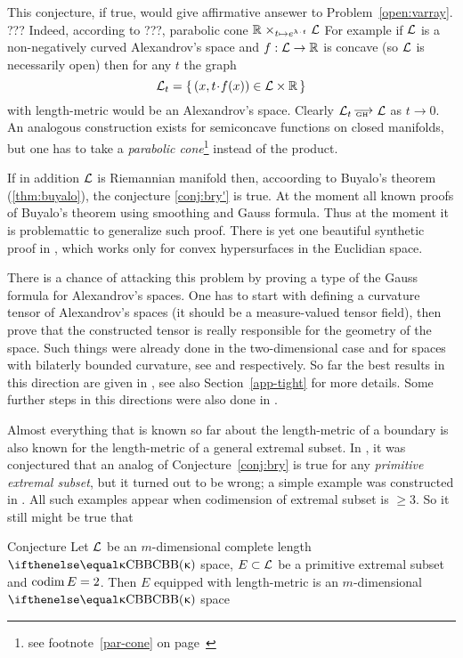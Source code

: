 This conjecture, if true, would give affirmative ansewer to Problem~\ref{open:varray}.
???
Indeed, according to ???,
parabolic cone $\RR\warp{t\mapsto e^{\lambda\cdot t}}\spc{L}$
For example if $\mathcal{L}$ is a non-negatively curved Alexandrov's space and $f:\spc{L}\to\RR$ is concave (so $\mathcal{L}$ is necessarily open) then for any $t$ the graph
\[\spc{L}_t=\{\,(x,t\cdot f(x))\in \spc{L}\times\RR\,\}\]
with length-metric would be an Alexandrov's space. 
Clearly $\spc{L}_t\GHto \spc{L}$ as $t\to0$. 
An analogous construction exists for semiconcave functions on closed manifolds, but
one has to take a \emph{parabolic cone}\footnote{see footnote~\ref{par-cone} on page~\pageref{par-cone}} instead of the product.




If in addition $\mathcal{L}$ is Riemannian manifold
then, accoording to Buyalo's theorem (\ref{thm:buyalo}),
the conjecture \ref{conj:bry'} is true.
At the moment all known proofs of Buyalo's theorem using smoothing and Gauss formula.
Thus at the moment it is problemattic to generalize such proof.
There is yet one beautiful synthetic proof in \cite{milka-conv}, which works only for convex hypersurfaces in the Euclidian space.

There is a chance of attacking this problem by proving a type of the Gauss formula for
Alexandrov's spaces. 
One has to start with defining a curvature tensor of Alexandrov's spaces (it
should be a measure-valued tensor field), then prove that the constructed tensor is really responsible for the geometry of the space. 
Such things were already done in the two-dimensional case and for spaces with bilaterly bounded curvature, see \cite{reshetnyak:curvature} and
\cite{nikolaev:curvature} respectively.
So far the best results in this direction are given in \cite{perelman:DC}, 
see also Section~\ref{app-tight} for more details.
Some further steps in this directions were also done in \cite{lebedeva-curv}. 

Almost everything that is known so far about the length-metric of a boundary is also known for the length-metric of a general extremal subset.
In \cite{perelman-petrunin:extremal}, it was conjectured  that an analog of Conjecture~\ref{conj:bry} is true for any \emph{primitive extremal subset}, but it turned out to be wrong; a simple example was constructed in \cite{petrunin:extremal}. 
All such examples appear when codimension of extremal subset is $\ge 3$.
So it still might be true that

\begin{thm}{Conjecture}\label{conj:codim=2}
Let $\mathcal{L}$ be an $m$-dimensional complete length $\Alex\kappa$ space, $E\subset \spc{L}$ be a primitive extremal subset and $\mathop{\rm codim}\nolimits E=2$.
Then $E$ equipped with length-metric is an $m$-dimensional $\Alex\kappa$ space
\end{thm}


